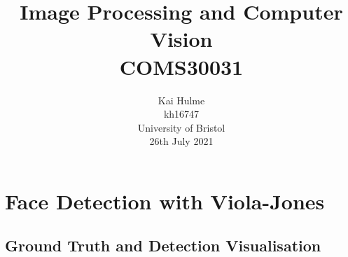 \documentclass[11pt]{article}
\title{Image Processing and Computer Vision \\[1ex] COMS30031}
\author{
    Kai Hulme \\
    kh16747 \\
    University of Bristol \\
    26th July 2021 \\
}
\begin{document}
\maketitle
\newpage

\section{Face Detection with Viola-Jones}
\label{vj_object_detector}

\subsection{Ground Truth and Detection Visualisation}



\end{document}
